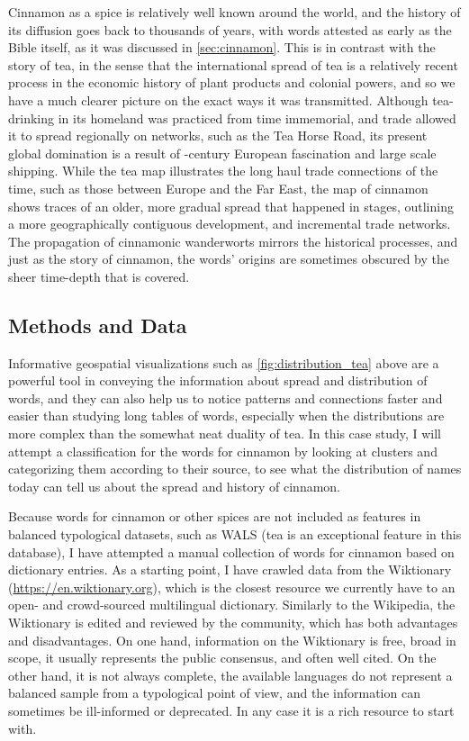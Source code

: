 Cinnamon as a spice is relatively well known around the world, and the history of its diffusion goes back to thousands of years, with words attested as early as the Bible itself, as it was discussed in \cref{sec:cinnamon}. This is in contrast with the story of tea, in the sense that the international spread of tea is a relatively recent process in the economic history of plant products and colonial powers, and so we have a much clearer picture on the exact ways it was transmitted. Although tea-drinking in its homeland was practiced from time immemorial, and trade allowed it to spread regionally on networks, such as the Tea Horse Road, its present global domination is a result of -century European fascination and large scale shipping. While the tea map illustrates the long haul trade connections of the time, such as those between Europe and the Far East, the map of cinnamon shows traces of an older, more gradual spread that happened in stages, outlining a more geographically contiguous development, and incremental trade networks. The propagation of cinnamonic \glspl{wanderwort} mirrors the historical processes, and just as the story of cinnamon, the words' origins are sometimes obscured by the sheer time-depth that is covered.

\subsection{Methods and Data}

Informative geospatial visualizations such as \cref{fig:distribution_tea} above are a powerful tool in conveying the information about spread and distribution of words, and they can also help us to notice patterns and connections faster and easier than studying long tables of words, especially when the distributions are more complex than the somewhat neat duality of tea. In this case study, I will attempt a classification for the words for cinnamon by looking at clusters and categorizing them according to their source, to see what the distribution of names today can tell us about the spread and history of cinnamon.

Because words for cinnamon or other spices are not included as features in balanced typological datasets, such as \gls{WALS} (tea is an exceptional feature in this database), I have attempted a manual collection of words for cinnamon based on dictionary entries. As a starting point, I have crawled data from the Wiktionary (\url{https://en.wiktionary.org}), which is the closest resource we currently have to an open- and crowd-sourced multilingual dictionary. Similarly to the Wikipedia, the Wiktionary is edited and reviewed by the community, which has both advantages and disadvantages. On one hand, information on the Wiktionary is free, broad in scope, it usually represents the public consensus, and often well cited. On the other hand, it is not always complete, the available languages do not represent a balanced sample from a typological point of view, and the information can sometimes be ill-informed or deprecated. In any case it is a rich resource to start with. 

